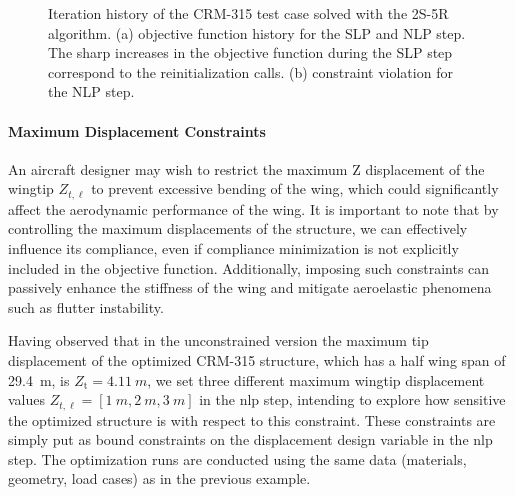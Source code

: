     \begin{figure}
        \centering
        \bigskip
        \caption{Iteration history of the CRM-315 test case solved with the 2S-5R algorithm. (a) objective function history for the SLP and NLP step. The sharp increases in the objective function during the SLP step correspond to the reinitialization calls. (b) constraint violation for the NLP step.}
        \label{fig:07_c2}
    \end{figure}

\paragraph{Maximum Displacement Constraints}
An aircraft designer may wish to restrict the maximum Z displacement of the wingtip $Z_{t,\ell}$ to prevent excessive bending of the wing, which could significantly affect the aerodynamic performance of the wing. It is important to note that by controlling the maximum displacements of the structure, we can effectively influence its compliance, even if compliance minimization is not explicitly included in the objective function. Additionally, imposing such constraints can passively enhance the stiffness of the wing and mitigate aeroelastic phenomena such as flutter instability.

Having observed that in the unconstrained version the maximum tip displacement of the optimized CRM-315 structure, which has a half wing span of \qty{29.4}{m}, is $Z_\text{t}=\qty{4.11}{m}$, we set three different maximum wingtip displacement values $Z_{t,\ell} = [\qty{1}{m},\qty{2}{m},\qty{3}{m}]$ in the \gls{nlp} step, intending to explore how sensitive the optimized structure is with respect to this constraint. These constraints are simply put as bound constraints on the displacement design variable in the \gls{nlp} step. The optimization runs are conducted using the same data (materials, geometry, load cases) as in the previous example.

